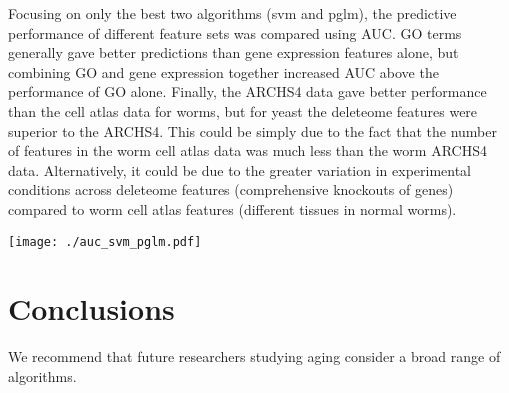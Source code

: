 \documentclass{article}
\begin{document}
Focusing on only the best two algorithms (svm and pglm), the predictive performance of different feature sets was compared using AUC. GO terms generally gave better predictions than gene expression features alone, but combining GO and gene expression together increased AUC above the performance of GO alone. Finally, the ARCHS4 data gave better performance than the cell atlas data for worms, but for yeast the deleteome features were superior to the ARCHS4. This could be simply due to the fact that the number of features in the worm cell atlas data was much less than the worm ARCHS4 data. Alternatively, it could be due to the greater variation in experimental conditions across deleteome features (comprehensive knockouts of genes) compared to worm cell atlas features (different tissues in normal worms).

\texttt{[image: ./auc\_svm\_pglm.pdf]}

\section{Conclusions}

We recommend that future researchers studying aging consider a broad range of algorithms.



\end{document}
